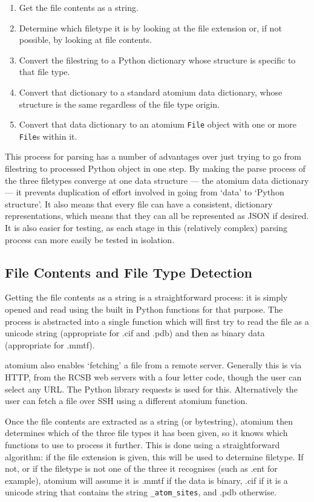 \begin{enumerate}
   \item Get the file contents as a string.
   \item Determine which filetype it is by looking at the file extension or, if not possible, by looking at file contents.
   \item Convert the filestring to a Python dictionary whose structure is specific to that file type.
   \item Convert that dictionary to a standard atomium data dictionary, whose structure is the same regardless of the file type origin.
   \item Convert that data dictionary to an atomium \texttt{File} object with one or more \texttt{File}s within it.
\end{enumerate}

This process for parsing has a number of advantages over just trying to go from filestring to processed Python object in one step. By making the parse process of the three filetypes converge at one data structure --- the atomium data dictionary --- it prevents duplication of effort involved in going from `data' to `Python structure'. It also means that every file can have a consistent, dictionary representations, which means that they can all be represented as JSON if desired. It is also easier for testing, as each stage in this (relatively complex) parsing process can more easily be tested in isolation.

\subsection{File Contents and File Type Detection}

Getting the file contents as a string is a straightforward process: it is simply opened and read using the built in Python functions for that purpose. The process is abstracted into a single function which will first try to read the file as a unicode string (appropriate for .cif and .pdb) and then as binary data (appropriate for .mmtf).

atomium also enables `fetching' a file from a remote server. Generally this is via HTTP, from the RCSB web servers \cite{burley2020pdb} with a four letter code, though the user can select any URL. The Python library requests \cite{requests} is used for this. Alternatively the user can fetch a file over SSH using a different atomium function.

Once the file contents are extracted as a string (or bytestring), atomium then determines which of the three file types it has been given, so it knows which functions to use to process it further. This is done using a straightforward algorithm: if the file extension is given, this will be used to determine filetype. If not, or if the filetype is not one of the three it recognises (such as .ent for example), atomium will assume it is .mmtf if the data is binary, .cif if it is a unicode string that contains the string \texttt{\_atom\_sites}, and .pdb otherwise.

